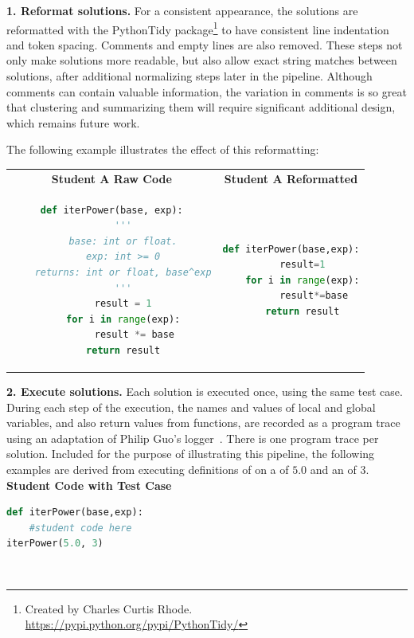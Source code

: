 {\bf 1. Reformat solutions.} For a consistent appearance, the solutions are reformatted with the PythonTidy package\footnote{Created by Charles Curtis Rhode. \url{https://pypi.python.org/pypi/PythonTidy/}} to have consistent line indentation and token spacing. Comments and empty lines are also removed. These steps not only make solutions more readable, but also allow exact string matches between solutions, after additional normalizing steps later in the pipeline. Although comments can contain valuable information, the variation in comments is so great that clustering and summarizing them will require significant additional design, which remains future work.

The following example illustrates the effect of this reformatting:

\begin{tabular}{cc}
{\bf Student A Raw Code} & {\bf Student A Reformatted} \\
\begin{minipage}{0.5\linewidth}
\begin{lstlisting}[language=python]
def iterPower(base, exp):
    '''
    base: int or float.
    exp: int >= 0
    returns: int or float, base^exp
    '''
    result = 1
    for i in range(exp):
        result *= base
    return result
\end{lstlisting}
\end{minipage}
&
\begin{minipage}{0.5\linewidth}
\begin{lstlisting}[language=python]
def iterPower(base,exp):
    result=1
    for i in range(exp):
        result*=base
    return result
\end{lstlisting}
\end{minipage}
\end{tabular}



{\bf 2. Execute solutions.} Each solution is executed once, using the same test case. During each step of the execution, the names and values of local and global variables, and also return values from functions, are recorded as a program trace using an adaptation of Philip Guo's logger~\cite{pgbovineOPT}. There is one program trace per solution. Included for the purpose of illustrating this pipeline, the following examples are derived from executing definitions of  on a  of $5.0$ and an  of $3$. \\

{\bf Student Code with Test Case} \\
\begin{minipage}{0.5\linewidth}
\begin{lstlisting}[language=python]
def iterPower(base,exp):
    #student code here
iterPower(5.0, 3)
\end{lstlisting}
\end{minipage} \\




